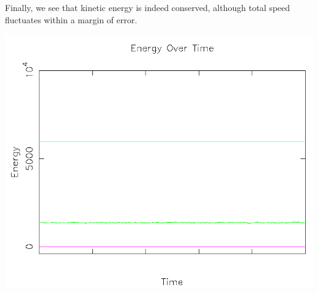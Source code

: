 \documentclass{article}
\begin{document}
Finally, we see that kinetic energy is indeed conserved, although total speed fluctuates within a margin of error.
\\
\begin{center}
    \includegraphics[scale=0.5]{uncharged_random_energy}
\end{center}
\end{document}
